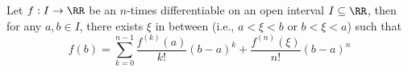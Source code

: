 

\begin{proposition}
Let $f: I\to\RR$ be an $n$-times differentiable on an open 
interval $I\subseteq\RR$, then for any $a,b\in I$, there exists 
$\xi$ in between (i.e., $a<\xi<b$ or $b<\xi<a$) such that
$$
f(b) = \sum_{k=0}^{n-1} \frac{f^{(k)}(a)}{k!}(b-a)^k + \frac{f^{(n)}(\xi)}{n!}(b-a)^n
$$
\end{proposition}

